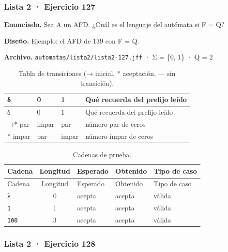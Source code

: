 \hypertarget{lista-2-ejercicio-127}{%
\subsubsection{Lista 2 · Ejercicio 127}\label{lista-2-ejercicio-127}}

\textbf{Enunciado.} Sea A un AFD. ¿Cuál es el lenguaje del autómata si F = Q?

\textbf{Diseño.} Ejemplo: el AFD de 139 con F = Q.

\textbf{Archivo.} \texttt{automatas/lista2/lista2-127.jff} · Σ = \{0, 1\} · \textbar Q\textbar{} = 2

\begin{longtable}[]{@{}llll@{}}
\caption{Tabla de transiciones (→ inicial, * aceptación, --- sin transición).}\tabularnewline
\toprule\noalign{}
δ & 0 & 1 & Qué recuerda del prefijo leído \\
\midrule\noalign{}
\endfirsthead
\toprule\noalign{}
δ & 0 & 1 & Qué recuerda del prefijo leído \\
\midrule\noalign{}
\endhead
\bottomrule\noalign{}
\endlastfoot
→* par & impar & par & número par de ceros \\
* impar & par & impar & número impar de ceros \\
\end{longtable}

\begin{longtable}[]{@{}lclll@{}}
\caption{Cadenas de prueba.}\tabularnewline
\toprule\noalign{}
Cadena & Longitud & Esperado & Obtenido & Tipo de caso \\
\midrule\noalign{}
\endfirsthead
\toprule\noalign{}
Cadena & Longitud & Esperado & Obtenido & Tipo de caso \\
\midrule\noalign{}
\endhead
\bottomrule\noalign{}
\endlastfoot
λ & 0 & acepta & acepta & válida \\
\texttt{1} & 1 & acepta & acepta & válida \\
\texttt{100} & 3 & acepta & acepta & válida \\
\end{longtable}


\hypertarget{lista-2-ejercicio-128}{%
\subsubsection{Lista 2 · Ejercicio 128}\label{lista-2-ejercicio-128}}

